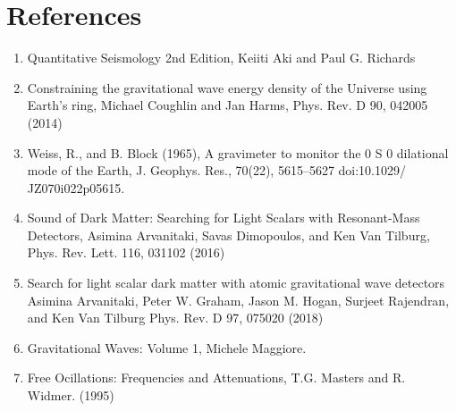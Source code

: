 \documentclass{article}
\begin{document}
\section{References}
 \begin{enumerate}
\item Quantitative Seismology 2nd Edition, Keiiti Aki and Paul G. Richards

\item Constraining the gravitational wave energy density of the Universe using Earth’s ring, Michael Coughlin and Jan Harms, Phys. Rev. D 90, 042005 (2014) 

\item Weiss, R., and B. Block (1965), A gravimeter to monitor the 0 S 0 dilational mode of the Earth, J. Geophys. Res., 70(22), 5615–5627 doi:10.1029/ JZ070i022p05615.

\item Sound of Dark Matter: Searching for Light Scalars with Resonant-Mass Detectors, Asimina Arvanitaki, Savas Dimopoulos, and Ken Van Tilburg, Phys. Rev. Lett. 116, 031102 (2016)

\item Search for light scalar dark matter with atomic gravitational wave detectors
Asimina Arvanitaki, Peter W. Graham, Jason M. Hogan, Surjeet Rajendran, and Ken Van Tilburg
Phys. Rev. D 97, 075020 (2018)

\item Gravitational Waves: Volume 1, Michele Maggiore.

\item Free Ocillations: Frequencies and Attenuations, T.G. Masters and R. Widmer. (1995)
\end{enumerate}
\end{document}

